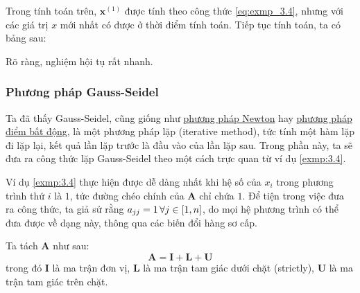 \documentclass[../../Lectures]{subfiles}
\begin{document}
\begin{exmp}
    Trong tính toán trên, \(\bm{x}^{(1)}\) được tính theo công thức
    \eqref{eq:exmp_3.4}, nhưng với các giá trị \(x\) mới nhất có được ở thời
    điểm tính toán. Tiếp tục tính toán, ta có bảng sau:

    Rõ ràng, nghiệm hội tụ rất nhanh.
\end{exmp}

\subsubsection{Phương pháp Gauss-Seidel}

Ta đã thấy Gauss-Seidel, cũng giống như \hyperref[chapter2:method:newton]{phương
pháp Newton} hay \hyperref[chapter2:method:fixed_point]{phương pháp điểm bất
động}, là một phương pháp lặp (iterative method), tức tính một hàm lặp đi lặp
lại, kết quả lần lặp trước là đầu vào của lần lặp sau. Trong phần này, ta sẽ đưa
ra công thức lặp Gauss-Seidel theo một cách trực quan từ ví dụ \ref{exmp:3.4}.

Ví dụ \ref{exmp:3.4} thực hiện được dễ dàng nhất khi hệ số của \(x_i\) trong
phương trình thứ \(i\) là \(1\), tức đường chéo chính của \(\bm{A}\) chỉ chứa
\(1\). Để tiện trong việc đưa ra công thức, ta giả sử rằng \(a_{jj} = 1 \,
\forall j \in \interval{1}{n}\), do mọi hệ phương trình có thể đưa được về dạng
này, thông qua các biến đổi hàng sơ cấp.

Ta tách \(\bm{A}\) như sau:
\[\bm{A} = \bm{I} + \bm{L} + \bm{U}\]
trong đó \(\bm{I}\) là ma trận đơn vị, \(\bm{L}\) là ma trận tam giác dưới chặt
(strictly), \(\bm{U}\) là ma trận tam giác trên chặt.
\end{document}
